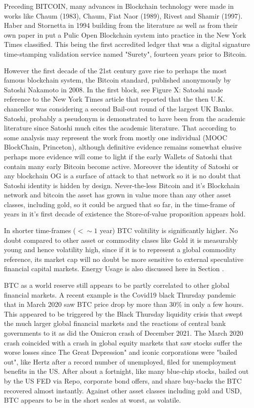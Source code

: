 \documentclass[final,5p,times,twocolumn,authoryear]{elsarticle}
\begin{document}
Preceding BITCOIN, many advances in Blockchain technology were made in works like Chaum (1983), Chaum, Fiat Naor (1989), Rivest and Shamir (1997). Haber and Stornetta in 1994 building from the literature as well as from their own paper in \cite{Haber1991wi} put a Pulic Open Blockchain system into practice in the New York Times classified. This being the first accredited ledger that was a digital signature time-stamping validation service named "Surety", fourteen years prior to Bitcoin. 

However the first decade of the 21st century gave rise to perhaps the most famous blockchain system, the Bitcoin standard, published anonymously by Satoshi Nakamoto in 2008.  In the first block, see Figure X: Satoshi made reference to the New York Times article that reported that the then U.K. chancellor was considering a second Bail-out round of the largest UK Banks. Satoshi, probably a pseudonym is demonstrated to have been from the academic literature since Satoshi much cites the academic literature. That according to some analysis may represent the work from mostly one individual (MOOC BlockChain, Princeton), although definitive evidence remains somewhat elusive perhaps more evidence will come to light if the early Wallets of Satoshi that contain many early Bitcoin become active. Moreover the identity of Satoshi or any blockchain OG is a surface of attack to that network so it is no doubt that Satoshi identity is hidden by design. Never-the-less Bitcoin and it's Blockchain network and bitcoin the asset has grown in value more than any other asset classes, including gold, so it could be argued that so far, in the time-frame of years in it's first decade of existence the Store-of-value proposition appears hold.

In shorter time-frames ($\lt \sim 1$ year) BTC volitility is significantly higher. No doubt compared to other asset or commodity clases like Gold it is measurably young and hence volatility high, since if it is to represent a global commodity reference, its market cap will no doubt be more sensitive to external speculative financial capital markets. Energy Usage is also discussed here in Section . 
 
BTC as a world reserve still appears to be partly correlated to other global financial markets. A recent example is the Covid19 black Thursday pandemic that in March 2020 saw BTC price drop by more than 30\% in only a few hours. This appeared to be triggered by the Black Thursday liquidity crisis that swept the much larger global financial markets and the reactions of central bank governments to it as did the Omicron crash of December 2021. The March 2020 crash coincided with a crash in global equity markets that saw stocks suffer the worse losses since The Great Depression" and iconic corporations were "bailed out", like Hertz after a record number of unemployed, filed for unemployment benefits in the US. After about a fortnight, like many blue-chip stocks, bailed out by the US FED via Repo, corporate bond offers, and share buy-backs the BTC recovered almost instantly. Against other asset classes including gold and USD, BTC appears to be in the short scales at worst, as volatile. 
 
\end{document}
